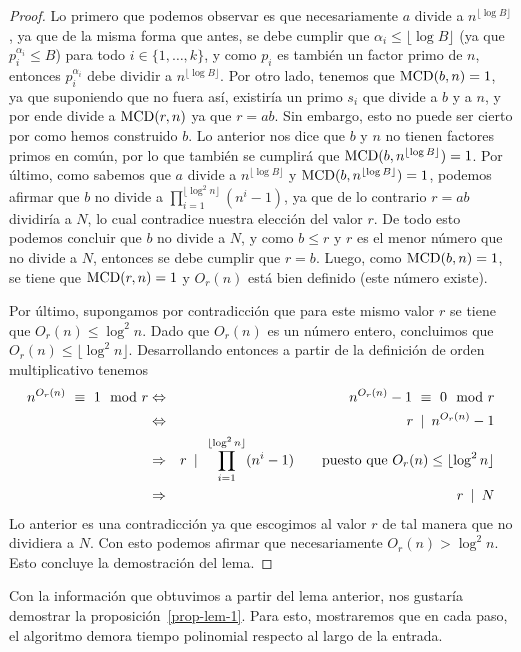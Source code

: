 \begin{proof}
Lo primero que podemos observar es que necesariamente $a$ divide a $n^{\lfloor \log B\rfloor}$, ya que de la misma forma que antes, se debe cumplir que $\alpha_i\leq \lfloor \log B\rfloor$ (ya que $p_i^{\alpha_i}\leq B$) para todo $i \in \{1, \ldots, k\}$, y como $p_i$ es también un factor primo de $n$, entonces $p_i^{\alpha_i}$ debe dividir a $n^{\lfloor \log B\rfloor}$. Por otro lado, tenemos que ${\rm MCD}(b,n) = 1$, ya que suponiendo que no fuera así, existiría un primo $s_i$ que divide a $b$ y a $n$, y por ende divide a ${\rm MCD}(r,n)$ ya que $r=ab$. Sin embargo, esto no puede ser cierto por como hemos construido $b$. Lo anterior nos dice que $b$ y $n$ no tienen factores primos en común, por lo que también se cumplirá que ${\rm MCD}(b,n^{\lfloor \log B\rfloor}) = 1$. Por último, como sabemos que $a$ divide a $n^{\lfloor \log B\rfloor}$ y ${\rm MCD}(b,n^{\lfloor \log B\rfloor})=1$, podemos afirmar que $b$ no divide a $\prod_{i=1}^{\lfloor \log ^2n \rfloor} (n^i-1)$, ya que de lo contrario $r = ab$ dividiría a $N$, lo cual contradice nuestra elección del valor $r$. De todo esto podemos concluir que $b$ no divide a $N$, y como $b\leq r$ y $r$ es el menor número que no divide a $N$, entonces se debe cumplir que $r = b$. Luego,  como ${\rm MCD}(b,n)=1$, se tiene que ${\rm MCD}(r,n) = 1$ y $O_r(n)$ está bien definido (este número existe).

Por último, supongamos por contradicción que para este mismo valor $r$ se tiene que $O_r(n) \leq \log^2 n$. Dado que $O_r(n)$ es un número entero, concluimos que $O_r(n) \leq \lfloor\log^2 n\rfloor$.
Desarrollando entonces a partir de la definición de orden multiplicativo tenemos
\begin{eqnarray*}
	n^{O_r(n)} \ \equiv \ 1 \mod r & \Leftrightarrow & n^{O_r(n)} - 1 \ \equiv \ 0 \mod r \\
	& \Leftrightarrow & r\ \hspace{1.8pt}|\hspace{1.8pt} \ n^{O_r(n)} - 1\\
	&\Rightarrow & r \ \hspace{1.8pt}|\hspace{1.8pt} \ \prod_{i=1}^{ \lfloor\log ^2n\rfloor} (n^i-1) \quad\quad \text{puesto que }O_r(n) \leq \lfloor \log^2 n \rfloor\\	
	&\Rightarrow & r\ \hspace{1.8pt}|\hspace{1.8pt} \ N 
\end{eqnarray*}
Lo anterior es una contradicción ya que escogimos al valor $r$ de tal manera que no dividiera a $N$. Con esto podemos afirmar que necesariamente $O_r(n) > \log^2 n$. Esto concluye la demostración del lema. 
	\end{proof}
	Con la información que obtuvimos a partir del lema anterior, nos gustaría demostrar la proposición~\ref{prop-lem-1}. Para esto, mostraremos que en cada paso, el algoritmo demora tiempo polinomial respecto al largo de la entrada.
